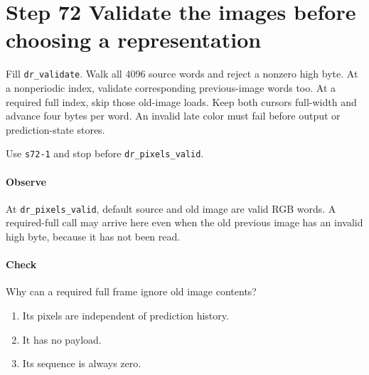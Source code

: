 \section{Step 72 Validate the images before choosing a representation}
Fill \texttt{dr\_validate}. Walk all 4096 source words and reject a nonzero high byte. At a nonperiodic index, validate corresponding previous-image words too. At a required full index, skip those old-image loads. Keep both cursors full-width and advance four bytes per word. An invalid late color must fail before output or prediction-state stores.

Use \texttt{s72-1} and stop before \texttt{dr\_pixels\_valid}.

\paragraph{Observe} At \texttt{dr\_pixels\_valid}, default source and old image are valid RGB words. A required-full call may arrive here even when the old previous image has an invalid high byte, because it has not been read.

\paragraph{Check} Why can a required full frame ignore old image contents?
\begin{enumerate}[label=\Alph*.]
  \item Its pixels are independent of prediction history.
  \item It has no payload.
  \item Its sequence is always zero.
\end{enumerate}
